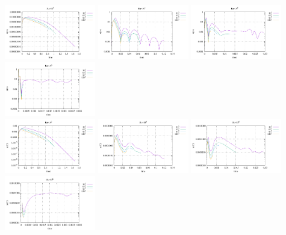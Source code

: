 \begin{center}
\includegraphics[width=3.97cm]{python_codes/fieldstone_155/results/conv_v_Ra1e3}
\includegraphics[width=3.97cm]{python_codes/fieldstone_155/results/conv_v_Ra1e4}
\includegraphics[width=3.97cm]{python_codes/fieldstone_155/results/conv_v_Ra1e5}
\includegraphics[width=3.97cm]{python_codes/fieldstone_155/results/conv_v_Ra1e6}\\
\includegraphics[width=3.97cm]{python_codes/fieldstone_155/results/conv_T_Ra1e3}
\includegraphics[width=3.97cm]{python_codes/fieldstone_155/results/conv_T_Ra1e4}
\includegraphics[width=3.97cm]{python_codes/fieldstone_155/results/conv_T_Ra1e5}
\includegraphics[width=3.97cm]{python_codes/fieldstone_155/results/conv_T_Ra1e6}\\

\end{center}
